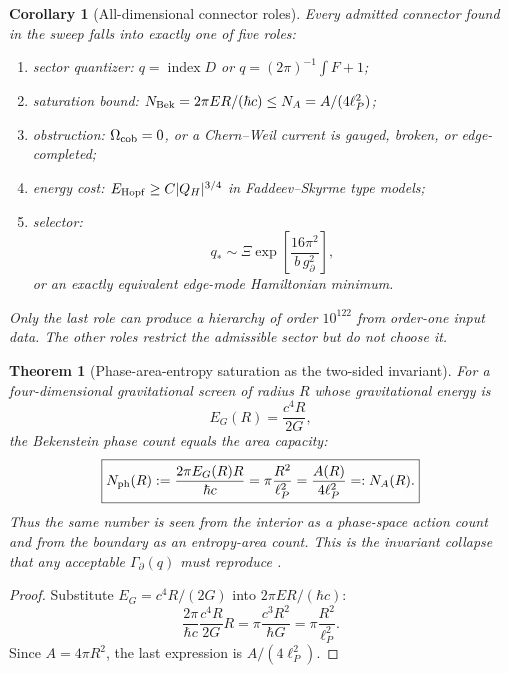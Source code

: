 \documentclass[aps,prd,reprint,nofootinbib,superscriptaddress,floatfix]{revtex4-2}
\numberwithin{equation}{section}
\theoremstyle{definition}
\theoremstyle{plain}
\newtheorem{theorem}{Theorem}[section]
\newtheorem{corollary}{Corollary}[section]
\begin{document}
\begin{corollary}[All-dimensional connector roles]
Every admitted connector found in the sweep falls into exactly one of five
roles:
\begin{enumerate}
\item sector quantizer: \(q=\operatorname{index}D\) or
\(q=(2\pi)^{-1}\int F+1\);
\item saturation bound: \(N_{\rm Bek}=2\pi ER/(\hbar c)\le
N_A=A/(4\ell_P^2)\);
\item obstruction: \(\Omega_{\rm cob}=0\), or a Chern--Weil current is
gauged, broken, or edge-completed;
\item energy cost: \(E_{\rm Hopf}\ge C|Q_H|^{3/4}\) in Faddeev--Skyrme type
models;
\item selector:
\begin{equation}
q_*\sim \Xi\exp\!\left[\frac{16\pi^2}{b\,g_\partial^2}\right],
\end{equation}
or an exactly equivalent edge-mode Hamiltonian minimum.
\end{enumerate}
Only the last role can produce a hierarchy of order \(10^{122}\) from
order-one input data.  The other roles restrict the admissible sector but do
not choose it.
\end{corollary}

\begin{theorem}[Phase-area-entropy saturation as the two-sided invariant]
For a four-dimensional gravitational screen of radius \(R\) whose gravitational
energy is
\begin{equation}
E_G(R)=\frac{c^4R}{2G},
\end{equation}
the Bekenstein phase count equals the area capacity:
\begin{equation}
\boxed{
N_{\rm ph}(R):=\frac{2\pi E_G(R)R}{\hbar c}
=
\pi\frac{R^2}{\ell_P^2}
=
\frac{A(R)}{4\ell_P^2}
=:N_A(R).
}
\end{equation}
Thus the same number is seen from the interior as a phase-space action count
and from the boundary as an entropy-area count.  This is the invariant
collapse that any acceptable \(\Gamma_\partial(q)\) must reproduce
\cite{Bekenstein1981,Susskind1995,Bousso2002}.
\end{theorem}

\begin{proof}
Substitute \(E_G=c^4R/(2G)\) into \(2\pi ER/(\hbar c)\):
\[
\frac{2\pi}{\hbar c}\frac{c^4R}{2G}R
=
\pi\frac{c^3R^2}{\hbar G}
=
\pi\frac{R^2}{\ell_P^2}.
\]
Since \(A=4\pi R^2\), the last expression is \(A/(4\ell_P^2)\).
\end{proof}
\end{document}
